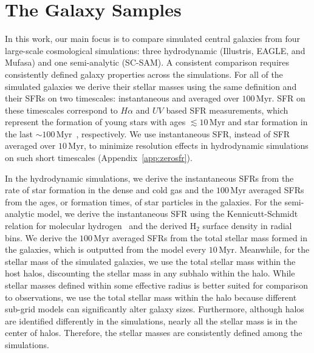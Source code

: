 \documentclass[tighten, preprint]{aastex62}
\begin{document}
\section{The Galaxy Samples} \label{sec:galsims}%
In this work, our main focus is to compare simulated central galaxies 
from four large-scale cosmological simulations: three hydrodynamic 
(Illustris, EAGLE, and {\sc Mufasa}) and one semi-analytic (SC-SAM). 
A consistent comparison requires consistently defined galaxy properties
across the simulations. For all of the simulated galaxies we derive 
their stellar masses using the same 
definition and their SFRs on two timescales: instantaneous and averaged over 
$100\,\mathrm{Myr}$. SFR on these timescales correspond to $H{\alpha}$ 
and $UV$ based SFR measurements, which represent the formation of young 
stars with ages ${\lesssim}10\,\mathrm{Myr}$ and star formation in the 
last ${\sim}100\,\mathrm{Myr}$~\citep[e.g.][]{kennicutt2012}, 
respectively. We use instantaneous SFR, instead of SFR averaged over 
$10\,\mathrm{Myr}$, to minimize resolution effects in hydrodynamic simulations 
on such short timescales (Appendix~\ref{app:zerosfr}).

In the hydrodynamic simulations, we derive the instantaneous SFRs from 
the rate of star formation in the dense and cold gas and the $100\,\mathrm{Myr}$ 
averaged SFRs from the ages, or formation times, of star particles 
in the galaxies. For the semi-analytic model, we derive the 
instantaneous SFR using the Kennicutt-Schmidt relation for molecular 
hydrogen~\citep[based on][]{bigiel2008} and the derived H$_2$ surface 
density in radial bins. We derive the $100\,\mathrm{Myr}$ averaged SFRs 
from the total stellar mass formed in the galaxies, which is outputted 
from the model every $10\,\mathrm{Myr}$. 
Meanwhile, for the stellar mass of the simulated galaxies, we 
use the total stellar mass within the host halos, discounting the 
stellar mass in any subhalo within the halo. While stellar masses 
defined within some effective radius is better suited for comparison 
to observations, we use the total stellar mass within the halo because
different sub-grid models can significantly alter galaxy sizes.
Furthermore, although halos are identified differently in the simulations, 
nearly all the stellar mass is in the center of halos. Therefore, the 
stellar masses are consistently defined among the simulations. 
\end{document}

